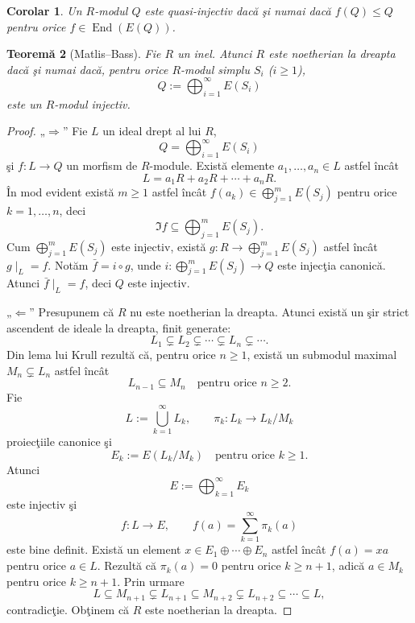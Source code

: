\documentclass[12pt,a4paper]{book}
\DeclareMathOperator{\End}{End}
\theoremstyle{plain}
\newtheorem{theorem}{Teoremă}[section] %
\newtheorem{corollary}[theorem]{Corolar}
\theoremstyle{definition}
\theoremstyle{remark}
\begin{document}
\begin{corollary}
Un \(R\)-modul \(Q\) este quasi-injectiv dacă şi numai dacă
\(f(Q) \leq Q\) pentru orice \(f \in \End(E(Q))\).
\end{corollary}



\begin{theorem}[Matlis--Bass]
Fie \(R\) un inel. Atunci \(R\) este noetherian la dreapta dacă şi numai dacă,
pentru orice \(R\)-modul simplu \(S_i\) (\(i \geq 1\)),
\[
Q := \bigoplus_{i=1}^{\infty} E(S_i)
\]
este un \(R\)-modul injectiv.
\end{theorem}

\begin{proof}
„\(\Rightarrow\)” Fie \(L\) un ideal drept al lui \(R\),
\[
Q = \bigoplus_{i=1}^{\infty} E(S_i)
\]
şi \(f : L \to Q\) un morfism de \(R\)-module.
Există elemente \(a_1,\dots,a_n \in L\) astfel încât
\[
L = a_1 R + a_2 R + \cdots + a_n R.
\]
În mod evident există \(m \geq 1\) astfel încât
\(f(a_k) \in \bigoplus_{j=1}^{m} E(S_j)\) pentru orice \(k = 1,\dots,n\),
deci
\[
\Im f \subseteq \bigoplus_{j=1}^{m} E(S_j).
\]
Cum \(\bigoplus_{j=1}^{m} E(S_j)\) este injectiv, există
\(g : R \to \bigoplus_{j=1}^{m} E(S_j)\) astfel încât \(g\!\mid_{L} = f\).
Notăm \(\bar{f} = i \circ g\), unde
\(i : \bigoplus_{j=1}^{m} E(S_j) \to Q\) este injecţia canonică.
Atunci \(\bar{f}\!\mid_{L} = f\), deci \(Q\) este injectiv.

„\(\Leftarrow\)” Presupunem că \(R\) nu este noetherian la dreapta.
Atunci există un şir strict ascendent de ideale la dreapta, finit generate:
\[
L_1 \subsetneq L_2 \subsetneq \cdots \subsetneq L_n \subsetneq \cdots .
\]
Din lema lui Krull rezultă că, pentru orice \(n \geq 1\), există un submodul
maximal \(M_n \subsetneq L_n\) astfel încât
\[
L_{n-1} \subseteq M_n \quad \text{pentru orice } n \geq 2.
\]
Fie
\[
L := \bigcup_{k=1}^{\infty} L_k, \qquad
\pi_k : L_k \longrightarrow L_k/M_k
\]
proiecţiile canonice şi
\[
E_k := E(L_k/M_k) \quad \text{pentru orice } k \geq 1.
\]
Atunci
\[
E := \bigoplus_{k=1}^{\infty} E_k
\]
este injectiv şi
\[
f : L \longrightarrow E, \qquad
f(a) = \sum_{k=1}^{\infty} \pi_k(a)
\]
este bine definit.
Există un element
\(x \in E_1 \oplus \cdots \oplus E_n\) astfel încât
\(f(a) = x a\) pentru orice \(a \in L\).
Rezultă că \(\pi_k(a) = 0\) pentru orice \(k \geq n+1\),
adică \(a \in M_k\) pentru orice \(k \geq n+1\).
Prin urmare
\[
L \subseteq M_{n+1} \subsetneq L_{n+1} \subseteq M_{n+2} \subsetneq L_{n+2}
\subseteq \cdots \subseteq L,
\]
contradicţie.
Obţinem că \(R\) este noetherian la dreapta.
\end{proof}
\end{document}
